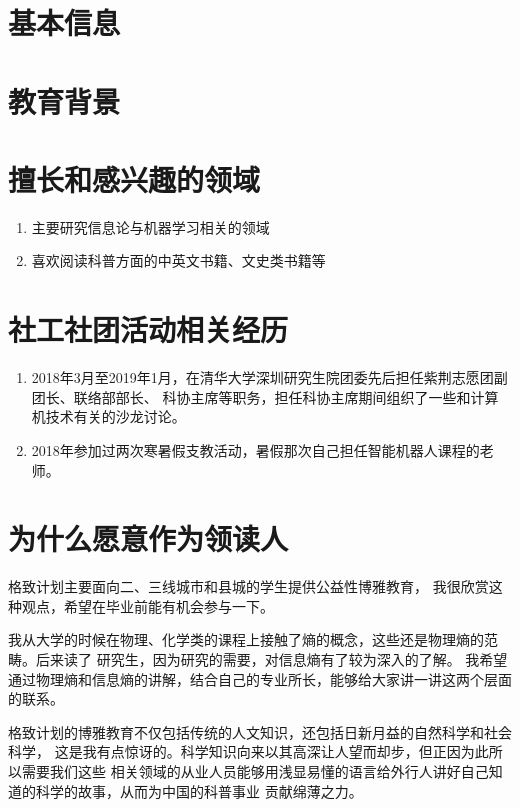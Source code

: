 \documentclass[12pt,colorlinks,linkcolor=true]{moderncv}
\begin{document}
\makecvtitle
\section{基本信息}
\section{教育背景}
\section{擅长和感兴趣的领域}
\begin{enumerate}
\item 主要研究信息论与机器学习相关的领域
\item 喜欢阅读科普方面的中英文书籍、文史类书籍等
\end{enumerate}
\section{社工社团活动相关经历}
\begin{enumerate}
\item
2018年3月至2019年1月，在清华大学深圳研究生院团委先后担任紫荆志愿团副团长、联络部部长、
科协主席等职务，担任科协主席期间组织了一些和计算机技术有关的沙龙讨论。
\item 2018年参加过两次寒暑假支教活动，暑假那次自己担任智能机器人课程的老师。
\end{enumerate}
\section{为什么愿意作为领读人}
格致计划主要面向二、三线城市和县城的学生提供公益性博雅教育，
我很欣赏这种观点，希望在毕业前能有机会参与一下。

我从大学的时候在物理、化学类的课程上接触了熵的概念，这些还是物理熵的范畴。后来读了
研究生，因为研究的需要，对信息熵有了较为深入的了解。
我希望通过物理熵和信息熵的讲解，结合自己的专业所长，能够给大家讲一讲这两个层面的联系。

格致计划的博雅教育不仅包括传统的人文知识，还包括日新月益的自然科学和社会科学，
这是我有点惊讶的。科学知识向来以其高深让人望而却步，但正因为此所以需要我们这些
相关领域的从业人员能够用浅显易懂的语言给外行人讲好自己知道的科学的故事，从而为中国的科普事业
贡献绵薄之力。
\end{document}
